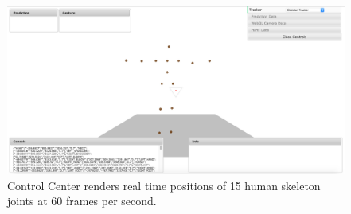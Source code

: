 \begin{figure}
	[h] \centering 
	\includegraphics[width=145mm]{figures/content/cc-skeleton.jpg} 
	\caption{Control Center renders real time positions of 15 human skeleton joints at 60 frames per second.} 
	\label{fg:cc:skeleton} 
\end{figure}